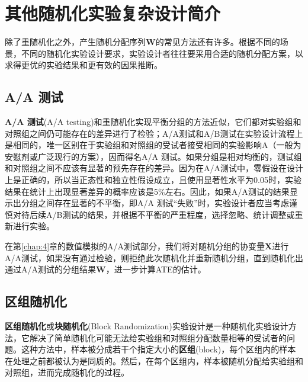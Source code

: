 
\chapter{其他随机化实验复杂设计简介}\label{chap3}

除了重随机化之外，产生随机分配序列$\mathbf{W}$的常见方法还有许多。根据不同的场景，不同的随机化实验设计要求，实验设计者往往要采用合适的随机分配方案，以求得更优的实验结果和更有效的因果推断。

\section{A/A 测试}\label{chap3:AAtest}
\textbf{A/A 测试}(A/A testing)和重随机化实现平衡分组的方法近似，它们都对实验组和对照组之间仍可能存在的差异进行了检验；A/A测试和A/B测试在实验设计流程上是相同的，唯一区别在于实验组和对照组的受试者接受相同的实验影响A（一般为安慰剂或广泛现行的方案），因而得名A/A 测试。如果分组是相对均衡的，测试组和对照组之间不应该有显著的预先存在的差异。因为在A/A测试中，零假设在设计上是正确的，所以当正态性和独立性假设成立，且使用显著性水平为0.05时，实验结果在统计上出现显著差异的概率应该是5\%左右。因此，如果A/A测试的结果显示出分组之间存在显著的不平衡，即A/A 测试“失败”时，实验设计者应当考虑谨慎对待后续A/B测试的结果，并根据不平衡的严重程度，选择忽略、统计调整或重新进行实验\cite{AAtest}。

在第\ref{chap:4}章的数值模拟的A/A测试部分，我们将对随机分组的协变量$\mathbf{X}$进行A/A测试，如果没有通过检验，则拒绝此次随机化并重新随机分组，直到随机化出通过A/A测试的分组结果$\mathbf{W}$，进一步计算ATE的估计。


\section{区组随机化}
\textbf{区组随机化}或\textbf{块随机化}(Block Randomization)实验设计是一种随机化实验设计方法，它解决了简单随机化可能无法给实验组和对照组分配数量相等的受试者的问题。这种方法中，样本被分成若干个指定大小的\textbf{区组}(block)，每个区组内的样本在处理之前都被认为是同质的。然后，在每个区组内，样本被随机分配给实验组和对照组\cite{mcentegart2014block}，进而完成随机化的过程。

